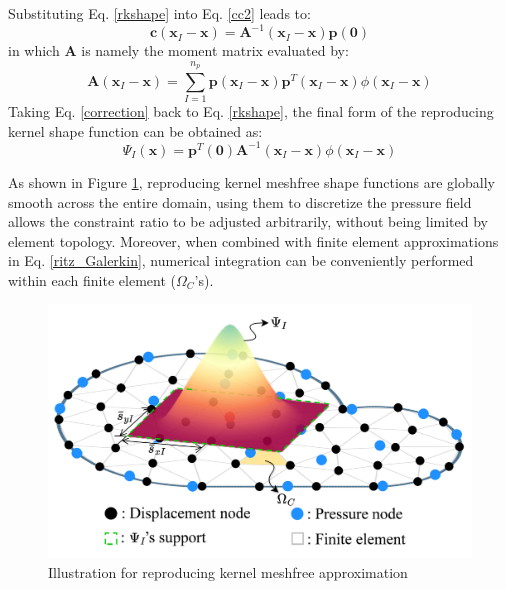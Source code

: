 Substituting Eq. \ref{rkshape} into Eq. \eqref{cc2} leads to:
\begin{equation}\label{correction}
\boldsymbol{c}(\boldsymbol{x}_I-\boldsymbol{x}) = \boldsymbol{A}^{-1}(\boldsymbol{x}_I-\boldsymbol{x}) \boldsymbol{p}(\boldsymbol{0})
\end{equation}
in which $\boldsymbol{A}$ is namely the moment matrix evaluated by:
\begin{equation}
\boldsymbol{A}(\boldsymbol{x}_I-\boldsymbol{x}) = \sum_{I=1}^{n_p} \boldsymbol{p}(\boldsymbol{x}_I-\boldsymbol{x}) \boldsymbol{p}^T(\boldsymbol{x}_I-\boldsymbol{x}) \phi(\boldsymbol{x}_I-\boldsymbol{x})
\end{equation}
Taking Eq. \eqref{correction} back to Eq. \eqref{rkshape}, the final form of the reproducing kernel shape function can be obtained as:
\begin{equation}
\Psi_I(\boldsymbol{x}) = \boldsymbol{p}^T(\boldsymbol{0}) \boldsymbol{A}^{-1}(\boldsymbol{x}_I-\boldsymbol{x}) \phi(\boldsymbol{x}_I-\boldsymbol{x})
\end{equation}

As shown in Figure \ref{fg:rk_approximation},
reproducing kernel meshfree shape functions are globally smooth across the entire domain,
using them to discretize the pressure field allows the constraint ratio to be adjusted arbitrarily, without being limited by element topology.
Moreover, when combined with finite element approximations in Eq. \ref{ritz_Galerkin},
numerical integration can be conveniently performed within each finite element ($\Omega_C$'s).

\begin{figure}[H]
\centering
\includegraphics[width=\textwidth]{png/mix.png}
\caption{Illustration for reproducing kernel meshfree approximation}\label{fg:rk_approximation}
\end{figure}

